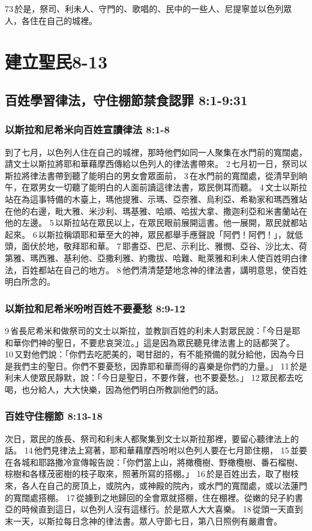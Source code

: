 73 於是，祭司、利未人、守門的、歌唱的、民中的一些人、尼提寧並以色列眾人，各住在自己的城裡。

\section{建立聖民8-13}
\subsection{百姓學習律法，守住棚節禁食認罪 8:1-9:31}
\subsubsection{以斯拉和尼希米向百姓宣讀律法 8:1-8}
到了七月，以色列人住在自己的城裡，那時他們如同一人聚集在水門前的寬闊處，請文士以斯拉將耶和華藉摩西傳給以色列人的律法書帶來。 2 七月初一日，祭司以斯拉將律法書帶到聽了能明白的男女會眾面前， 3 在水門前的寬闊處，從清早到晌午，在眾男女一切聽了能明白的人面前讀這律法書，眾民側耳而聽。 4 文士以斯拉站在為這事特備的木臺上，瑪他提雅、示瑪、亞奈雅、烏利亞、希勒家和瑪西雅站在他的右邊，毗大雅、米沙利、瑪基雅、哈順、哈拔大拿、撒迦利亞和米書蘭站在他的左邊。 5 以斯拉站在眾民以上，在眾民眼前展開這書。他一展開，眾民就都站起來。 6 以斯拉稱頌耶和華至大的神，眾民都舉手應聲說「阿們！阿們！」，就低頭，面伏於地，敬拜耶和華。 7 耶書亞、巴尼、示利比、雅憫、亞谷、沙比太、荷第雅、瑪西雅、基利他、亞撒利雅、約撒拔、哈難、毗萊雅和利未人使百姓明白律法，百姓都站在自己的地方。 8 他們清清楚楚地念神的律法書，講明意思，使百姓明白所念的。

\subsubsection{以斯拉和尼希米吩咐百姓不要憂愁 8:9-12}
9 省長尼希米和做祭司的文士以斯拉，並教訓百姓的利未人對眾民說：「今日是耶和華你們神的聖日，不要悲哀哭泣。」這是因為眾民聽見律法書上的話都哭了。 10 又對他們說：「你們去吃肥美的，喝甘甜的，有不能預備的就分給他，因為今日是我們主的聖日。你們不要憂愁，因靠耶和華而得的喜樂是你們的力量。」 11 於是利未人使眾民靜默，說：「今日是聖日，不要作聲，也不要憂愁。」 12 眾民都去吃喝，也分給人，大大快樂，因為他們明白所教訓他們的話。

\subsubsection{百姓守住棚節 8:13-18}
次日，眾民的族長、祭司和利未人都聚集到文士以斯拉那裡，要留心聽律法上的話。 14 他們見律法上寫著，耶和華藉摩西吩咐以色列人要在七月節住棚， 15 並要在各城和耶路撒冷宣傳報告說：「你們當上山，將橄欖樹、野橄欖樹、番石榴樹、棕樹和各樣茂密樹的枝子取來，照著所寫的搭棚。」 16 於是百姓出去，取了樹枝來，各人在自己的房頂上，或院內，或神殿的院內，或水門的寬闊處，或以法蓮門的寬闊處搭棚。 17 從擄到之地歸回的全會眾就搭棚，住在棚裡。從嫩的兒子約書亞的時候直到這日，以色列人沒有這樣行。於是眾人大大喜樂。 18 從頭一天直到末一天，以斯拉每日念神的律法書。眾人守節七日，第八日照例有嚴肅會。



